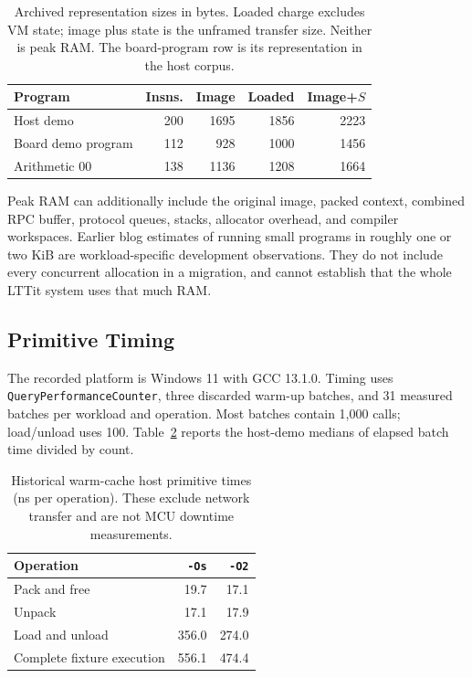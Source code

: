 \documentclass[conference,letterpaper]{IEEEtran}
\begin{document}
\begin{table}[t]
\caption{Archived representation sizes in bytes. Loaded charge excludes VM state; image plus state is the unframed transfer size. Neither is peak RAM. The board-program row is its representation in the host corpus.}
\label{tab:sizes}
\centering\small
\begin{tabular}{lrrrr}
\toprule
Program & Insns. & Image & Loaded & Image+$S$\\\midrule
Host demo & 200 & 1695 & 1856 & 2223\\
Board demo program & 112 & 928 & 1000 & 1456\\
Arithmetic 00 & 138 & 1136 & 1208 & 1664\\\bottomrule
\end{tabular}
\end{table}

Peak RAM can additionally include the original image, packed context, combined RPC buffer, protocol queues, stacks, allocator overhead, and compiler workspaces. Earlier blog estimates of running small programs in roughly one or two KiB are workload-specific development observations. They do not include every concurrent allocation in a migration, and cannot establish that the whole LTTit system uses that much RAM.

\subsection{Primitive Timing}
The recorded platform is Windows 11 with GCC 13.1.0. Timing uses \texttt{QueryPerformanceCounter}, three discarded warm-up batches, and 31 measured batches per workload and operation. Most batches contain 1,000 calls; load/unload uses 100. Table~\ref{tab:timing} reports the host-demo medians of elapsed batch time divided by count.

\begin{table}[t]
\caption{Historical warm-cache host primitive times (ns per operation). These exclude network transfer and are not MCU downtime measurements.}
\label{tab:timing}
\centering\small
\begin{tabular}{lrr}
\toprule
Operation & \texttt{-Os} & \texttt{-O2}\\\midrule
Pack and free & 19.7 & 17.1\\
Unpack & 17.1 & 17.9\\
Load and unload & 356.0 & 274.0\\
Complete fixture execution & 556.1 & 474.4\\\bottomrule
\end{tabular}
\end{table}
\end{document}
